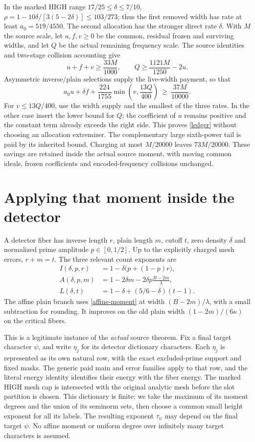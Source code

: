 \documentclass[10pt,a4paper]{article}
\begin{document}
In the marked HIGH range $17/25\leq\delta\leq7/10$,
$\rho=1-10\delta/[3(5-2\delta)]\leq103/273$; thus the first removed
width has rate at least $a_0=519/4550$. The second allocation has the
stronger direct rate $\delta$. With $M$ the source scale, let $u,f,v\geq0$
be the common, residual frozen and surviving widths, and let $Q$ be the
actual remaining frequency scale. The source identities and two-stage
collision accounting give
\[
 u+f+v\geq\frac{33M}{1000},\qquad
 Q\geq\frac{1121M}{1250}-2u.
\]
Asymmetric inverse/plain selections supply the live-width payment, so that
\begin{equation}
 a_0u+\delta f+\frac{224}{1755}\min\!\left(v,\frac{13Q}{400}\right)
 \ \geq\ \frac{37M}{10000}.\label{ledger}
\end{equation}
For $v\leq13Q/400$, use the width supply and the smallest of the three
rates. In the other case insert the lower bound for $Q$; the coefficient
of $u$ remains positive and the constant term already exceeds the right
side. This proves \eqref{ledger} without choosing an allocation extremizer.
The complementary large sixth-power tail is paid by its inherited bound.
Charging at most $M/20000$ leaves $73M/20000$. These savings are retained
inside the actual source moment, with moving common ideals, frozen
coefficients and encoded-frequency collisions unchanged.

\section{Applying that moment inside the detector}\label{sec:detector}
A detector fiber has inverse length $r$, plain length $m$, cutoff $t$,
zero density $\delta$ and normalized prime amplitude $p\in[0,1/2]$.
Up to the explicitly charged mesh errors, $r+m=t$. The three relevant count
exponents are
\begin{align}
 I(\delta,p,r)&=1-\delta\bigl(p+(1-p)r\bigr),\nonumber\\
 A(\delta,p,m)&=1-2\delta m-2\delta p\frac{B-2m}{\lambda},\label{branches}\\
 L(\delta,t)&=1-\delta+(5/6-\delta)(t-1).\nonumber
\end{align}
The affine plain branch uses \eqref{affine-moment} at width
$(B-2m)/\lambda$, with a small subtraction for rounding. It improves on
the old plain width $(1-2m)/(6\kappa)$ on the critical fibers.

This is a legitimate instance of the \emph{actual} source theorem.
Fix a final target character $\psi$, and write $\eta_j$ for its detector
dictionary characters. Each $\eta_j$ is represented as its own natural row,
with the exact excluded-prime support and fixed masks. The generic
paid main and error families apply to that row, and the literal energy
identity identifies their energy with the fiber energy. The marked HIGH
mesh cap is intersected with the original analytic mesh before the slot
partition is chosen. This dictionary is finite: we take the maximum of its
moment degrees and the union of its seminorm sets, then choose a common
small height exponent for all its labels. The resulting exponent
$\tau_\psi$ may depend on the final target $\psi$. No affine moment or
uniform degree over infinitely many target characters is assumed.
\end{document}
